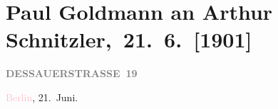 

\renewcommand{\erwaehntePersonen}{Personen: Moriz Benedikt, Olga Schnitzler}
\renewcommand{\erwaehnteInstitutionen}{Institutionen: Neue Freie Presse}
\renewcommand{\erwaehnteOrte}{Orte: Berlin, Dessauer Straße, Deutschland, Salzburg, Österreich}
\renewcommand{\erwaehnteWerke}{Werke: Leutnant Gustl. Parodie, Lieutenant Gustl. Novelle, Neue Freie Presse, Wien, 20. Juni}
\section[ Paul Goldmann an Arthur Schnitzler, 21. 6. {[}1901{]}]{Paul Goldmann an Arthur Schnitzler, 21. 6. {[}1901{]}}
\nopagebreak{}
\rehead{ }\normalsize\beginnumbering{}
\toendnotes[C]{\smallbreak\pagebreak[2]}
\toendnotes[C]{\smallbreak}
\pstart
           \noindent{}\raggedleft{}{\pb}\textcolor{pink}{\textcolor{gray}{\textbf{DESSAUERSTRASSE 19}}}{}\ledrightnote{\textcolor{pink}{Dessauer Straße}}\pend
           
\pstart
           \textcolor{pink}{Berlin}{}\ledrightnote{\textcolor{pink}{Berlin}}, 21. Juni.\pend
           
